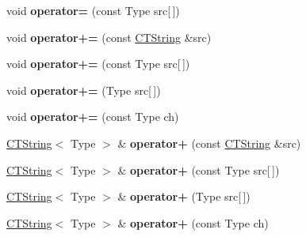\begin{DoxyCompactItemize}
\item 
\hypertarget{classps_1_1CTString_aa8eace6fcf7981192586af3d0ab959f6}{}void {\bfseries operator=} (const Type src\mbox{[}$\,$\mbox{]})\label{classps_1_1CTString_aa8eace6fcf7981192586af3d0ab959f6}

\item 
\hypertarget{classps_1_1CTString_ad9df67e14dd45faef022830059c7ae48}{}void {\bfseries operator+=} (const \hyperlink{classps_1_1CTString}{C\+T\+String} \&src)\label{classps_1_1CTString_ad9df67e14dd45faef022830059c7ae48}

\item 
\hypertarget{classps_1_1CTString_a8aa74453ffe8b538501125b9a351bd00}{}void {\bfseries operator+=} (const Type src\mbox{[}$\,$\mbox{]})\label{classps_1_1CTString_a8aa74453ffe8b538501125b9a351bd00}

\item 
\hypertarget{classps_1_1CTString_a68844c8e7dd1101ef1ca3fd140adf1d5}{}void {\bfseries operator+=} (Type src\mbox{[}$\,$\mbox{]})\label{classps_1_1CTString_a68844c8e7dd1101ef1ca3fd140adf1d5}

\item 
\hypertarget{classps_1_1CTString_a4b128df52923d4b043a4fab8945f7e9f}{}void {\bfseries operator+=} (const Type ch)\label{classps_1_1CTString_a4b128df52923d4b043a4fab8945f7e9f}

\item 
\hypertarget{classps_1_1CTString_a06bdf7c6bff3c03a8b162d218b8f9f13}{}\hyperlink{classps_1_1CTString}{C\+T\+String}$<$ Type $>$ \& {\bfseries operator+} (const \hyperlink{classps_1_1CTString}{C\+T\+String} \&src)\label{classps_1_1CTString_a06bdf7c6bff3c03a8b162d218b8f9f13}

\item 
\hypertarget{classps_1_1CTString_a61af4e2c52df7d2e79f9aeffa5080f84}{}\hyperlink{classps_1_1CTString}{C\+T\+String}$<$ Type $>$ \& {\bfseries operator+} (const Type src\mbox{[}$\,$\mbox{]})\label{classps_1_1CTString_a61af4e2c52df7d2e79f9aeffa5080f84}

\item 
\hypertarget{classps_1_1CTString_a4fb7a5a8f43e6697580f37647559db2b}{}\hyperlink{classps_1_1CTString}{C\+T\+String}$<$ Type $>$ \& {\bfseries operator+} (Type src\mbox{[}$\,$\mbox{]})\label{classps_1_1CTString_a4fb7a5a8f43e6697580f37647559db2b}

\item 
\hypertarget{classps_1_1CTString_a18e982d329ea199cdbcc72e69d2369d1}{}\hyperlink{classps_1_1CTString}{C\+T\+String}$<$ Type $>$ \& {\bfseries operator+} (const Type ch)\label{classps_1_1CTString_a18e982d329ea199cdbcc72e69d2369d1}

\end{DoxyCompactItemize}
